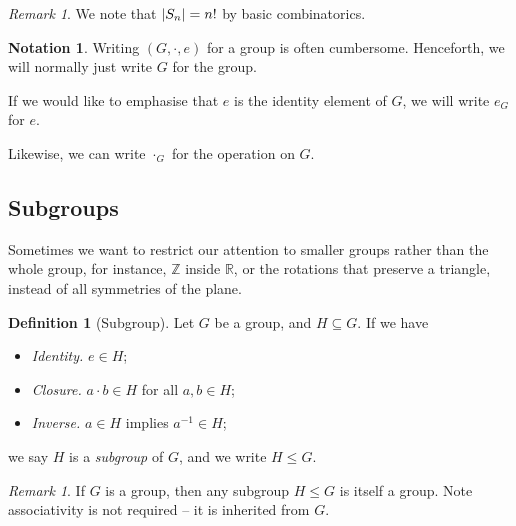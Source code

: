 \documentclass{article}
\theoremstyle{definition}
\newtheorem{definition}[theorem]{Definition}
\newtheorem{notation}[theorem]{Notation}
\theoremstyle{remark}
\newtheorem{remark}[theorem]{Remark}
\DeclarePairedDelimiter{\abs}{\lvert}{\rvert}
\newcommand{\pqty}[1]{\left(#1\right)}
\newcommand{\inverse}{^{-1}}
\newcommand{\subgroup}{\leq}
\newcommand{\ZZ}{\mathbb{Z}}
\newcommand{\RR}{\mathbb{R}}
\begin{document}
\begin{remark}
    We note that \(\abs{S_n} = n!\) by basic combinatorics.
\end{remark}

\begin{notation}
    Writing \(\pqty{G, \cdot, e}\) for a group is often cumbersome. Henceforth, we will normally just write \(G\) for the group.
    
    If we would like to emphasise that \(e\) is the identity element of \(G\), we will write \(e_G\) for \(e\).

    Likewise, we can write \(\cdot_G\) for the operation on \(G\).
\end{notation}

\subsection{Subgroups}
\label{sec:subgroups}

Sometimes we want to restrict our attention to smaller groups rather than the whole group, for instance, \(\ZZ\) inside \(\RR\), or the rotations that preserve a triangle, instead of all symmetries of the plane.

\begin{definition}[Subgroup]
    \label{def:subgroup}%
    Let \(G\) be a group, and \(H \subseteq G\). If we have
    \begin{itemize}
        \item \emph{Identity.} \(e \in H\);
        \item \emph{Closure.} \(a \cdot b \in H\) for all \(a, b \in H\);
        \item \emph{Inverse.} \(a \in H\) implies \(a\inverse \in H\);
    \end{itemize}
    we say \(H\) is a \emph{subgroup} of \(G\), and we write \(H \subgroup G\).
\end{definition}

\begin{remark}
    If \(G\) is a group, then any subgroup \(H \subgroup G\) is itself a group. Note associativity is not required -- it is inherited from \(G\).
\end{remark}
\end{document}
